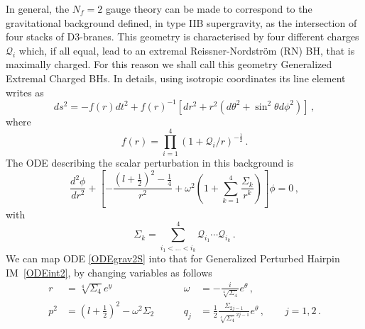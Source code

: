 \documentclass[11pt,a4paper]{elsarticle}
\def \th {\theta}
\def \ba {\begin{aligned}}
\def \ea {\end{aligned}}
\newcommand{\be}{\begin{equation}}
\newcommand{\ee}{\end{equation}}
\def\th{\theta}
\numberwithin{figure}{section}
\numberwithin{table}{section}
\begin{document}
In general, the $N_f=2$ gauge theory can be made to correspond to the gravitational background defined, in type IIB supergravity, as the intersection of four stacks of D3-branes. This geometry is characterised by four different charges $\mathcal{Q}_i$ which, if all equal, lead to an extremal Reissner-Nordstr\"om (RN) BH, that is maximally charged. For this reason we shall call this geometry Generalized Extremal Charged BHs. In details, using isotropic coordinates its line element writes as~\cite{Ikeda:2021,BianchiConsoliGrilloMorales:2021b}
\be  \label{lineintD3}
d s^2 = - f(r) d t^2 + f(r)^{-1}[d r^2 +r^2 (d \theta^2 + \sin^2 \theta d \phi^2)]\,,
\ee
where
\be
f(r) = \prod_{i=1}^4 \left(1 + \mathcal{Q}_i/r\right)^{-\frac{1}{2}}\,.
\ee
\normalsize
The ODE describing the scalar perturbation in this background is%
\be  \label{ODEgrav2S}
\frac{d^2 \phi}{d r^2}+\left [ -\frac{(l+\frac{1}{2})^2-\frac{1}{4}}{r^2}+\omega^2\left(1+\sum_{k=1}^4 \frac{\Sigma_k}{r^k}\right)\right ]\phi = 0\,,
\ee 
\normalsize
\normalsize
with
\be
\Sigma_k =\sum_{i_1 <...<i_k}^4 \mathcal{Q}_{i_1}\cdots \mathcal{Q}_{i_k}\,.
\ee
We can map ODE \eqref{ODEgrav2S} into that for Generalized Perturbed Hairpin IM~\eqref{ODEint2}, by changing variables as follows%
\be \label{DictIntD3branes}
\ba
r&=\sqrt[4]{\Sigma_4} e^{y} \qquad &\omega &= - \frac{i}{\sqrt[4]{\Sigma_4} } e^{\th}\,, \\ 
 p^2&=(l+\frac{1}{2})^2- \omega^2 \Sigma_2\,\qquad &q_j &= \frac{1}{2} \frac{\Sigma_{2j-1}}{\sqrt[4]{\Sigma_4}^{2j-1}} e^\th\,, \qquad j=1,2 \,.%
\ea 
\ee 
\normalsize 
\end{document}
